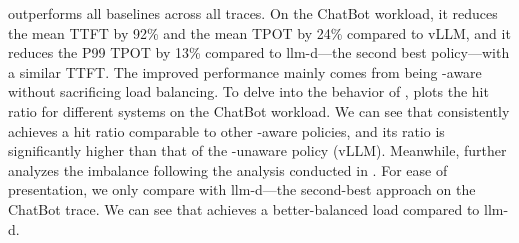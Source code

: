 {\sys} outperforms all baselines across all traces.
On the ChatBot workload, 
it reduces the mean TTFT by 92\% and the mean TPOT by 24\% compared to vLLM, 
and it reduces the P99 TPOT by 13\% compared to llm-d---the second best policy---with a similar TTFT.
The improved performance mainly comes from being {\kvcache}-aware
without sacrificing load balancing.
To delve into the behavior of {\sys},
{} plots the {\kvcache} hit ratio for different systems
on the ChatBot workload.
We can see that {\sys} consistently achieves a {\kvcache} hit ratio comparable to other
{\kvcache}-aware policies, and its ratio is significantly higher than that of the
{\kvcache}-unaware policy (vLLM).
Meanwhile,
{} further analyzes the imbalance
following the
analysis conducted in \textsection{\ref{sec:challenge-balancing}}.
For ease of presentation, we only compare {\sys} with llm-d---the second-best approach on the ChatBot trace.
We can see that {\sys} achieves a better-balanced load compared to llm-d.


